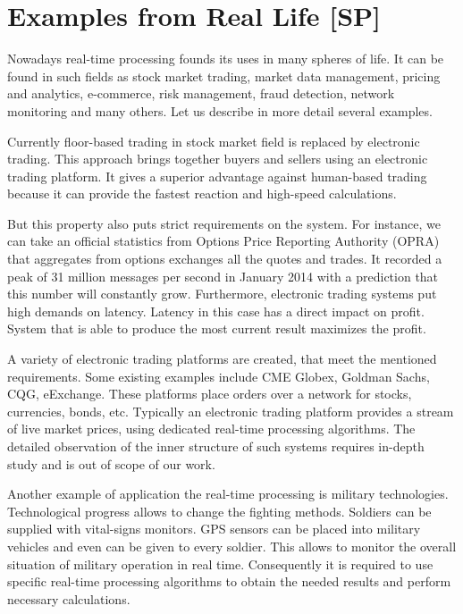 \section{Examples from Real Life [SP]}

% 
% 

Nowadays real-time processing founds its uses in many spheres of life.
It can be found in such fields as stock market trading, market data management, pricing and analytics, e-commerce, risk management, fraud detection, network monitoring and many others. 
Let us describe in more detail several examples.

Currently floor-based trading in stock market field is replaced by electronic trading.
This approach brings together buyers and sellers using an electronic trading platform.
It gives a superior advantage against human-based trading because it can provide the fastest reaction and high-speed calculations.

But this property also puts strict requirements on the system.
For instance, we can take an official statistics from Options Price Reporting Authority (OPRA) that aggregates from options exchanges all the quotes and trades.   
It recorded a peak of 31 million messages per second in January 2014 with a prediction that this number will constantly grow.
Furthermore, electronic trading systems put high demands on latency.
Latency in this case has a direct impact on profit.
System that is able to produce the most current result maximizes the profit. 

A variety of electronic trading platforms are created, that meet the mentioned requirements.
Some existing examples include CME Globex, Goldman Sachs, CQG, eExchange. 
These platforms place orders over a network for stocks, currencies, bonds, etc.
Typically an electronic trading platform provides a stream of live market prices, using dedicated real-time processing algorithms.
The detailed observation of the inner structure of such systems requires in-depth study and is out of scope of our work.

Another example of application the real-time processing is military technologies.
Technological progress allows to change the fighting methods.
Soldiers can be supplied with vital-signs monitors.
GPS sensors can be placed into military vehicles and even can be given to every soldier.
This allows to monitor the overall situation of military operation in real time.
Consequently it is required to use specific real-time processing algorithms to obtain the needed results and perform necessary calculations.

